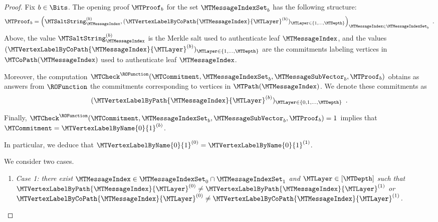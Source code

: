 \begin{proof}
Fix $b \in \Bits$. The opening proof $\MTProof_{b}$ for the set $\MTMessageIndexSet_{b}$ has the following structure:
\begin{equation*}
\MTProof_{b}
=
\Big(
  \MTSaltString_{\MTMessageIndex}^{(b)}
  ,
  (\MTVertexLabelByCoPath{\MTMessageIndex}{\MTLayer}^{(b)})_{\MTLayer \in \{1,\dots,\MTDepth\}}
\Big)_{\MTMessageIndex \in \MTMessageIndexSet_{b}}
\enspace.
\end{equation*}
Above, the value $\MTSaltString_{\MTMessageIndex}^{(b)}$ is the Merkle salt used to authenticate leaf $\MTMessageIndex$, and the values $(\MTVertexLabelByCoPath{\MTMessageIndex}{\MTLayer}^{(b)})_{\MTLayer \in \{1,\dots,\MTDepth\}}$ are the commitments labeling vertices in $\MTCoPath(\MTMessageIndex)$ used to authenticate leaf $\MTMessageIndex$.

Moreover, the computation $\MTCheck^{\ROFunction}(\MTCommitment,\MTMessageIndexSet_{b},\MTMessageSubVector_{b},\MTProof_{b})$ obtains as answers from $\ROFunction$ the commitments corresponding to vertices in $\MTPath(\MTMessageIndex)$. We denote these commitments as
\begin{equation*}
(\MTVertexLabelByPath{\MTMessageIndex}{\MTLayer}^{(b)})_{\MTLayer \in \{0,1,\dots,\MTDepth\}}
\enspace.
\end{equation*}

Finally, $\MTCheck^{\ROFunction}(\MTCommitment,\MTMessageIndexSet_{b},\MTMessageSubVector_{b},\MTProof_{b}) = 1$ implies that $\MTCommitment = \MTVertexLabelByName{0}{1}^{(b)}$.

In particular, we deduce that $\MTVertexLabelByName{0}{1}^{(0)}=\MTVertexLabelByName{0}{1}^{(1)}$.

We consider two cases.
\begin{enumerate}

  \item \emph{Case 1: there exist $\MTMessageIndex \in \MTMessageIndexSet_{0} \cap \MTMessageIndexSet_{1}$ and $\MTLayer \in [\MTDepth]$ such that $\MTVertexLabelByPath{\MTMessageIndex}{\MTLayer}^{(0)} \neq \MTVertexLabelByPath{\MTMessageIndex}{\MTLayer}^{(1)}$ or $\MTVertexLabelByCoPath{\MTMessageIndex}{\MTLayer}^{(0)} \neq \MTVertexLabelByCoPath{\MTMessageIndex}{\MTLayer}^{(1)}$.}


\end{enumerate}
\end{proof}
